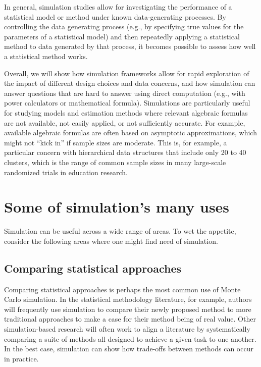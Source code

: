 \documentclass[
]{book}
\begin{document}
In general, simulation studies allow for investigating the performance of a statistical model or method under known data-generating processes.
By controlling the data generating process (e.g., by specifying true values for the parameters of a statistical model) and then repeatedly applying a statistical method to data generated by that process, it becomes possible to assess how well a statistical method works.

Overall, we will show how simulation frameworks allow for rapid exploration of the impact of different design choices and data concerns, and how simulation can answer questions that are hard to answer using direct computation (e.g., with power calculators or mathematical formula).
Simulations are particularly useful for studying models and estimation methods where relevant algebraic formulas are not available, not easily applied, or not sufficiently accurate.
For example, available algebraic formulas are often based on asymptotic approximations, which might not ``kick in'' if sample sizes are moderate.
This is, for example, a particular concern with hierarchical data structures that include only 20 to 40 clusters, which is the range of common sample sizes in many large-scale randomized trials in education research.

\hypertarget{some-of-simulations-many-uses}{%
\section{Some of simulation's many uses}\label{some-of-simulations-many-uses}}

Simulation can be useful across a wide range of areas.
To wet the appetite, consider the following areas where one might find need of simulation.

\hypertarget{comparing-statistical-approaches}{%
\subsection{Comparing statistical approaches}\label{comparing-statistical-approaches}}

Comparing statistical approaches is perhaps the most common use of Monte Carlo simulation.
In the statistical methodology literature, for example, authors will frequently use simulation to compare their newly proposed method to more traditional approaches to make a case for their method being of real value.
Other simulation-based research will often work to align a literature by systematically comparing a suite of methods all designed to achieve a given task to one another.
In the best case, simulation can show how trade-offs between methods can occur in practice.
\end{document}
